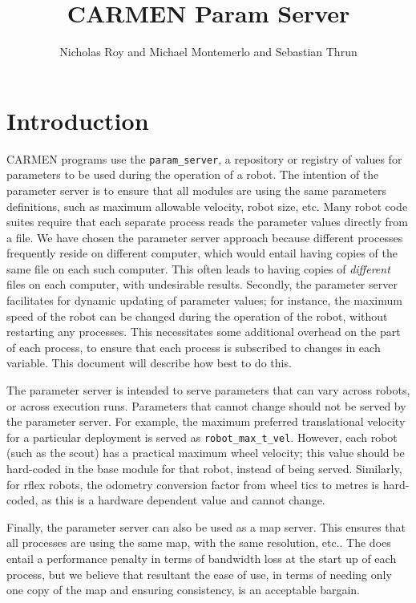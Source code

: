\documentclass{article}
\title{CARMEN Param Server}
\author{Nicholas Roy and Michael Montemerlo and Sebastian Thrun}
\begin{document}
\maketitle

\section{Introduction}

CARMEN programs use the \verb!param_server!, a repository or registry of
values for parameters to be used during the operation of a robot. The
intention of the parameter server is to ensure that all modules are using the
same parameters definitions, such as maximum allowable velocity, robot size,
etc. Many robot code suites require that each separate process reads the
parameter values directly from a file. We have chosen the parameter server
approach because different processes frequently reside on different computer,
which would entail having copies of the same file on each such computer. This
often leads to having copies of \emph{different} files on each computer, with
undesirable results. Secondly, the parameter server facilitates for dynamic
updating of parameter values; for instance, the maximum speed of the robot can
be changed during the operation of the robot, without restarting any
processes. This necessitates some additional overhead on the part of each
process, to ensure that each process is subscribed to changes in each
variable. This document will describe how best to do this.

The parameter server is intended to serve parameters that can vary across
robots, or across execution runs. Parameters that cannot change should not be
served by the parameter server. For example, the maximum preferred
translational velocity for a particular deployment is served as
\verb!robot_max_t_vel!. However, each robot (such as the scout) has a
practical maximum wheel velocity; this value should be hard-coded in the base
module for that robot, instead of being served. Similarly, for rflex robots,
the odometry conversion factor from wheel tics to metres is hard-coded, as
this is a hardware dependent value and cannot change. 

Finally, the parameter server can also be used as a map server. This ensures
that all processes are using the same map, with the same resolution, etc..
The does entail a performance penalty in terms of bandwidth loss at the start
up of each process, but we believe that resultant the ease of use, in terms of
needing only one copy of the map and ensuring consistency, is an acceptable
bargain.
\end{document}
